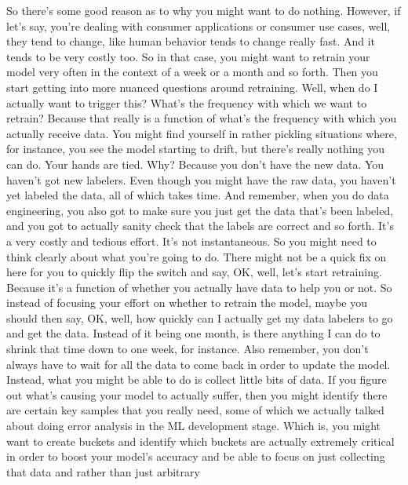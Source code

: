 {{{{{{{{     So there's some good reason as to why you might want to do nothing.
     However, if let's say, you're dealing with consumer applications or consumer
     use cases, well, they tend to change, like human behavior
     tends to change really fast.
     And it tends to be very costly too.
     So in that case, you might want to retrain
     your model very often in the context of a week or a month and so forth.
     Then you start getting into more nuanced questions around retraining.
     Well, when do I actually want to trigger this?
     What's the frequency with which we want to retrain?
     Because that really is a function of what's
     the frequency with which you actually receive data.
     You might find yourself in rather pickling situations
     where, for instance, you see the model starting to drift,
     but there's really nothing you can do.
     Your hands are tied.
     Why?
     Because you don't have the new data.
     You haven't got new labelers.
     Even though you might have the raw data, you
     haven't yet labeled the data, all of which takes time.
     And remember, when you do data engineering,
     you also got to make sure you just get the data that's been labeled,
     and you got to actually sanity check that the labels are correct and so
     forth.
     It's a very costly and tedious effort.
     It's not instantaneous.
     So you might need to think clearly about what you're going to do.
     There might not be a quick fix on here for you to quickly flip the switch
     and say, OK, well, let's start retraining.
     Because it's a function of whether you actually have data to help you or not.
     So instead of focusing your effort on whether to retrain the model,
     maybe you should then say, OK, well, how quickly
     can I actually get my data labelers to go and get the data.
     Instead of it being one month, is there anything
     I can do to shrink that time down to one week, for instance.
     Also remember, you don't always have to wait for all the data
     to come back in order to update the model.
     Instead, what you might be able to do is collect little bits of data.
     If you figure out what's causing your model to actually suffer,
     then you might identify there are certain key samples
     that you really need, some of which we actually
     talked about doing error analysis in the ML development stage.
     Which is, you might want to create buckets and identify
     which buckets are actually extremely critical
     in order to boost your model's accuracy and be
     able to focus on just collecting that data and rather than just arbitrary
}}}}}}}}
